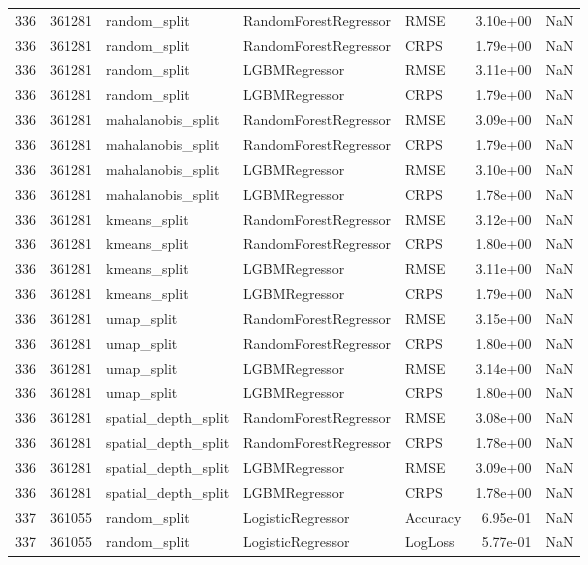 \begin{tabular}{rrlllrr}
336 & 361281 & random\_split & RandomForestRegressor & RMSE & 3.10e+00 & NaN \\
336 & 361281 & random\_split & RandomForestRegressor & CRPS & 1.79e+00 & NaN \\
336 & 361281 & random\_split & LGBMRegressor & RMSE & 3.11e+00 & NaN \\
336 & 361281 & random\_split & LGBMRegressor & CRPS & 1.79e+00 & NaN \\
336 & 361281 & mahalanobis\_split & RandomForestRegressor & RMSE & 3.09e+00 & NaN \\
336 & 361281 & mahalanobis\_split & RandomForestRegressor & CRPS & 1.79e+00 & NaN \\
336 & 361281 & mahalanobis\_split & LGBMRegressor & RMSE & 3.10e+00 & NaN \\
336 & 361281 & mahalanobis\_split & LGBMRegressor & CRPS & 1.78e+00 & NaN \\
336 & 361281 & kmeans\_split & RandomForestRegressor & RMSE & 3.12e+00 & NaN \\
336 & 361281 & kmeans\_split & RandomForestRegressor & CRPS & 1.80e+00 & NaN \\
336 & 361281 & kmeans\_split & LGBMRegressor & RMSE & 3.11e+00 & NaN \\
336 & 361281 & kmeans\_split & LGBMRegressor & CRPS & 1.79e+00 & NaN \\
336 & 361281 & umap\_split & RandomForestRegressor & RMSE & 3.15e+00 & NaN \\
336 & 361281 & umap\_split & RandomForestRegressor & CRPS & 1.80e+00 & NaN \\
336 & 361281 & umap\_split & LGBMRegressor & RMSE & 3.14e+00 & NaN \\
336 & 361281 & umap\_split & LGBMRegressor & CRPS & 1.80e+00 & NaN \\
336 & 361281 & spatial\_depth\_split & RandomForestRegressor & RMSE & 3.08e+00 & NaN \\
336 & 361281 & spatial\_depth\_split & RandomForestRegressor & CRPS & 1.78e+00 & NaN \\
336 & 361281 & spatial\_depth\_split & LGBMRegressor & RMSE & 3.09e+00 & NaN \\
336 & 361281 & spatial\_depth\_split & LGBMRegressor & CRPS & 1.78e+00 & NaN \\
337 & 361055 & random\_split & LogisticRegressor & Accuracy & 6.95e-01 & NaN \\
337 & 361055 & random\_split & LogisticRegressor & LogLoss & 5.77e-01 & NaN \\

\end{tabular}
